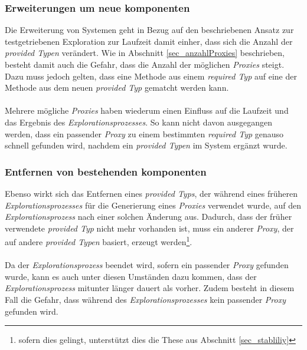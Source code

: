 \subsubsection{Erweiterungen um neue \Gls{komponente}n}
Die Erweiterung von Systemen geht in Bezug auf den beschriebenen Ansatz zur testgetriebenen Exploration zur Laufzeit damit einher, dass sich die Anzahl der \emph{provided Typen} verändert. Wie in Abschnitt \ref{sec_anzahlProxies} beschrieben, besteht damit auch die Gefahr, dass die Anzahl der möglichen \emph{Proxies} steigt. Dazu muss jedoch gelten, dass eine Methode aus einem \emph{required Typ} auf eine der Methode aus dem neuen \emph{provided Typ} gematcht werden kann.
\\\\
Mehrere mögliche \emph{Proxies} haben wiederum einen Einfluss auf die Laufzeit und das Ergebnis des \emph{Explorationsprozesses}. So kann nicht davon ausgegangen werden, dass ein passender \emph{Proxy} zu einem bestimmten \emph{required Typ} genauso schnell gefunden wird, nachdem ein \emph{provided Typen} im System ergänzt wurde.
\subsubsection{Entfernen von bestehenden \Gls{komponente}n}
Ebenso wirkt sich das Entfernen eines \emph{provided Typs}, der während eines früheren \emph{Explorationsprozesses} für die Generierung eines \emph{Proxies} verwendet wurde, auf den \emph{Explorationsprozess} nach einer solchen Änderung aus. Dadurch, dass der früher verwendete \emph{provided Typ} nicht mehr vorhanden ist, muss ein anderer \emph{Proxy}, der auf andere \emph{provided Typen} basiert, erzeugt werden\footnote{sofern dies gelingt, unterstützt dies die These aus Abschnitt \ref{sec_stabliliy}}.
\\\\
Da der \emph{Explorationsprozess} beendet wird, sofern ein passender \emph{Proxy} gefunden wurde, kann es auch unter diesen Umständen dazu kommen, dass der \emph{Explorationsprozess} mitunter länger dauert als vorher. Zudem besteht in diesem Fall die Gefahr, dass während des \emph{Explorationsprozesses} kein passender \emph{Proxy} gefunden wird.

